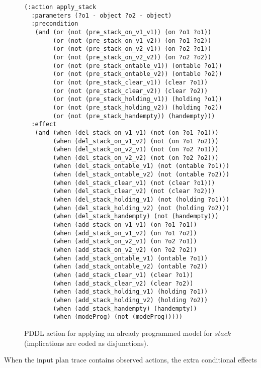 \documentclass[runningheads]{llncs}
\begin{document}
\begin{itemize}
\begin{enumerate}
{\begin{figure}[hbt!]
\begin{center}
\begin{scriptsize}
\begin{verbatim}
(:action apply_stack
  :parameters (?o1 - object ?o2 - object)
  :precondition
   (and (or (not (pre_stack_on_v1_v1)) (on ?o1 ?o1))
        (or (not (pre_stack_on_v1_v2)) (on ?o1 ?o2))
        (or (not (pre_stack_on_v2_v1)) (on ?o2 ?o1))
        (or (not (pre_stack_on_v2_v2)) (on ?o2 ?o2))
        (or (not (pre_stack_ontable_v1)) (ontable ?o1))
        (or (not (pre_stack_ontable_v2)) (ontable ?o2))
        (or (not (pre_stack_clear_v1)) (clear ?o1))
        (or (not (pre_stack_clear_v2)) (clear ?o2))
        (or (not (pre_stack_holding_v1)) (holding ?o1))
        (or (not (pre_stack_holding_v2)) (holding ?o2))
        (or (not (pre_stack_handempty)) (handempty)))
  :effect
   (and (when (del_stack_on_v1_v1) (not (on ?o1 ?o1)))
        (when (del_stack_on_v1_v2) (not (on ?o1 ?o2)))
        (when (del_stack_on_v2_v1) (not (on ?o2 ?o1)))
        (when (del_stack_on_v2_v2) (not (on ?o2 ?o2)))
        (when (del_stack_ontable_v1) (not (ontable ?o1)))
        (when (del_stack_ontable_v2) (not (ontable ?o2)))
        (when (del_stack_clear_v1) (not (clear ?o1)))
        (when (del_stack_clear_v2) (not (clear ?o2)))
        (when (del_stack_holding_v1) (not (holding ?o1)))
        (when (del_stack_holding_v2) (not (holding ?o2)))
        (when (del_stack_handempty) (not (handempty)))
        (when (add_stack_on_v1_v1) (on ?o1 ?o1))
        (when (add_stack_on_v1_v2) (on ?o1 ?o2))
        (when (add_stack_on_v2_v1) (on ?o2 ?o1))
        (when (add_stack_on_v2_v2) (on ?o2 ?o2))
        (when (add_stack_ontable_v1) (ontable ?o1))
        (when (add_stack_ontable_v2) (ontable ?o2))
        (when (add_stack_clear_v1) (clear ?o1))
        (when (add_stack_clear_v2) (clear ?o2))
        (when (add_stack_holding_v1) (holding ?o1))
        (when (add_stack_holding_v2) (holding ?o2))
        (when (add_stack_handempty) (handempty))
        (when (modeProg) (not (modeProg)))))
\end{verbatim}
\end{scriptsize}
 \caption{\small PDDL action for applying an already programmed model for $stack$ (implications are coded as disjunctions).}
\label{fig:compilation}
\end{center}
\end{figure}


When the input plan trace contains observed actions, the extra conditional effects

}
\end{enumerate}
\end{itemize}
\end{document}
